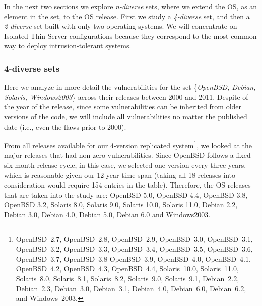 In the next two sections we explore \emph{n-diverse} sets, where we extend the OS, as an element in the set, to the OS release. First we study a \emph{4-diverse} set, and then a \emph{2-diverse} set built with only two operating systems. We will concentrate on Isolated Thin Server configurations because they correspond to the most common way to deploy intrusion-tolerant systems.


\subsubsection*{4-diverse sets}
Here we analyze in more detail the vulnerabilities for the set \{\emph{OpenBSD, Debian, Solaris, Windows2003}\} across their releases between 2000 and 2011. Despite of the year of the release, since some vulnerabilities can be inherited from older versions of the code, we will include all vulnerabilities no matter the published date (i.e., even the flaws prior to 2000).

From all releases available for our 4-version replicated system\footnote[1]{OpenBSD~2.7, OpenBSD~2.8, OpenBSD~2.9,   OpenBSD~3.0, OpenBSD~3.1, OpenBSD~3.2, OpenBSD~3.3, OpenBSD~3.4,   OpenBSD~3.5, OpenBSD~3.6, OpenBSD~3.7, OpenBSD~3.8 OpenBSD~3.9,   OpenBSD~4.0, OpenBSD~4.1, OpenBSD~4.2, OpenBSD~4.3, OpenBSD~4.4,   Solaris~10.0, Solaris~11.0, Solaris~8.0, Solaris~8.1, Solaris~8.2,   Solaris~9.0, Solaris~9.1, Debian~2.2, Debian~2.3, Debian~3.0,   Debian~3.1, Debian~4.0, Debian~6.0, Debian~6.2, and Windows~2003.}, we looked at the major releases that had non-zero vulnerabilities. Since OpenBSD follows a fixed six-month release cycle, in this case, we selected one version every three years, which is reasonable given our 12-year time span (taking all 18 releases into consideration would require 154 entries in the table). Therefore, the OS releases that are taken into the study are: OpenBSD 5.0, OpenBSD 4.4, OpenBSD 3.8, OpenBSD 3.2, Solaris 8.0, Solaris 9.0, Solaris 10.0, Solaris 11.0, Debian 2.2, Debian 3.0, Debian 4.0, Debian 5.0, Debian 6.0 and Windows2003.

